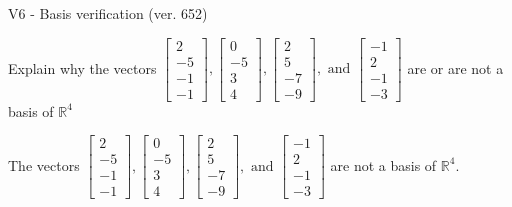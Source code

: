 \begin{exercise}
  \begin{exerciseTitle}V6 - Basis verification (ver. 652)\end{exerciseTitle}
  \begin{exerciseStatement}
    Explain why the vectors \(\left[\begin{array}{r}
2 \\
-5 \\
-1 \\
-1
\end{array}\right] , \left[\begin{array}{r}
0 \\
-5 \\
3 \\
4
\end{array}\right] , \left[\begin{array}{r}
2 \\
5 \\
-7 \\
-9
\end{array}\right] , \text{ and } \left[\begin{array}{r}
-1 \\
2 \\
-1 \\
-3
\end{array}\right]\) are or are not a basis of \(\mathbb{R}^4\)	


  \end{exerciseStatement}
  \begin{exerciseAnswer}
   The vectors \(\left[\begin{array}{r}
2 \\
-5 \\
-1 \\
-1
\end{array}\right] , \left[\begin{array}{r}
0 \\
-5 \\
3 \\
4
\end{array}\right] , \left[\begin{array}{r}
2 \\
5 \\
-7 \\
-9
\end{array}\right] , \text{ and } \left[\begin{array}{r}
-1 \\
2 \\
-1 \\
-3
\end{array}\right]\) 
  	 are not  a basis of \(\mathbb{R}^4\).
  


  \end{exerciseAnswer}
\end{exercise}